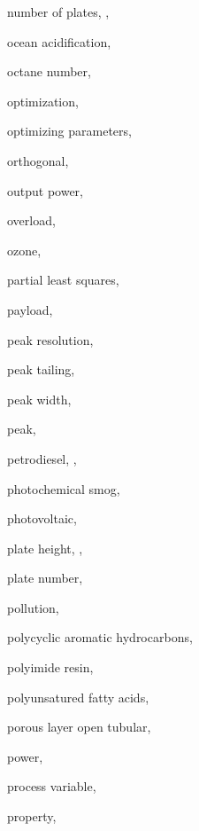 \begin{theindex}
  \item \lowercase {number of plates}, , 
  \item \lowercase {ocean acidification}, 
  \item \lowercase {octane number}, 
  \item \lowercase {optimization}, 
  \item \lowercase {optimizing parameters}, 
  \item \lowercase {orthogonal}, 
  \item \lowercase {output power}, 
  \item \lowercase {overload}, 
  \item \lowercase {ozone}, 
  \item \lowercase {partial least squares}, 
  \item \lowercase {payload}, 
  \item \lowercase {peak resolution}, 
  \item \lowercase {peak tailing}, 
  \item \lowercase {peak width}, 
  \item \lowercase {peak}, 
  \item \lowercase {petrodiesel}, , 
  \item \lowercase {photochemical smog}, 
  \item \lowercase {photovoltaic}, 
  \item \lowercase {plate height}, , 
  \item \lowercase {plate number}, 
  \item \lowercase {pollution}, 
  \item \lowercase {polycyclic aromatic hydrocarbons}, 
  \item \lowercase {polyimide resin}, 
  \item \lowercase {polyunsatured fatty acids}, 
  \item \lowercase {porous layer open tubular}, 
  \item \lowercase {power}, 
  \item \lowercase {process variable}, 
  \item \lowercase {property}, 

\end{theindex}
